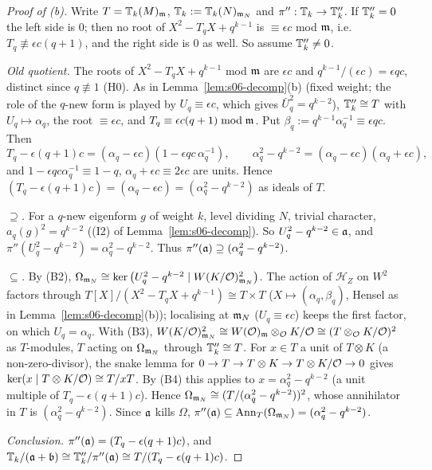 \begin{proof}[Proof of (b)]
Write $T=\mathbb{T}_k(M)_{\mathfrak{m}}$, $\mathbb{T}_k:=\mathbb{T}_k(N)_{\mathfrak{m}_N}$ and $\pi'':\mathbb{T}_k\to\mathbb{T}''_k$. If $\mathbb{T}''_k=0$ the left side is $0$; then no root of
$X^2-T_qX+q^{k-1}$ is $\equiv\epsilon c$ mod $\mathfrak{m}$, i.e.\ $T_q\not\equiv\epsilon c(q+1)$, and the right side is $0$ as well. So assume $\mathbb{T}''_k\ne0$.

\emph{Old quotient.} The roots of $X^2-T_qX+q^{k-1}$ mod $\mathfrak{m}$ are $\epsilon c$ and $q^{k-1}/(\epsilon c)=\epsilon qc$, distinct since
$q\not\equiv1$ (H0). As in Lemma~\ref{lem:s06-decomp}(b) (fixed weight; the role of the $q$-new form is played by $U_q\equiv\epsilon c$, which
gives $\bar U_q^2=q^{k-2}$), $\mathbb{T}''_k\cong T$ with $U_q\mapsto\alpha_q$, the root $\equiv\epsilon c$, and $T_q\equiv\epsilon c(q+1)\bmod\mathfrak{m}$. Put
$\beta_q:=q^{k-1}\alpha_q^{-1}\equiv\epsilon qc$. Then
\[T_q-\epsilon(q+1)c=(\alpha_q-\epsilon c)(1-\epsilon qc\,\alpha_q^{-1}),\qquad \alpha_q^2-q^{k-2}=(\alpha_q-\epsilon c)(\alpha_q+\epsilon c),\]
and $1-\epsilon qc\alpha_q^{-1}\equiv1-q$, $\alpha_q+\epsilon c\equiv2\epsilon c$ are units. Hence
$(T_q-\epsilon(q+1)c)=(\alpha_q-\epsilon c)=(\alpha_q^2-q^{k-2})$ as ideals of $T$.

\emph{$\supseteq$.} For a $q$-new eigenform $g$ of weight $k$, level dividing $N$, trivial character, $a_q(g)^2=q^{k-2}$ ((I2) of
Lemma~\ref{lem:s06-decomp}). So $U_q^2-q^{k-2}\in\mathfrak{a}$, and $\pi''(U_q^2-q^{k-2})=\alpha_q^2-q^{k-2}$. Thus $\pi''(\mathfrak{a})\supseteq(\alpha_q^2-q^{k-2})$.

\emph{$\subseteq$.} By (B2), $\Omega_{\mathfrak{m}_N}\cong\ker\big(U_q^2-q^{k-2}\mid W(K/\mathcal{O})^2_{\mathfrak{m}_N}\big)$. The action of $\mathcal H_Z$ on $W^2$ factors through
$T[X]/(X^2-T_qX+q^{k-1})\cong T\times T$ ($X\mapsto(\alpha_q,\beta_q)$, Hensel as in Lemma~\ref{lem:s06-decomp}(b)); localising at $\mathfrak{m}_N$
($U_q\equiv\epsilon c$) keeps the first factor, on which $U_q=\alpha_q$. With (B3),
$W(K/\mathcal{O})^2_{\mathfrak{m}_N}\cong W(\mathcal{O})_{\mathfrak{m}}\otimes_{\mathcal{O}} K/\mathcal{O}\cong(T\otimes_{\mathcal{O}} K/\mathcal{O})^2$ as $T$-modules, $T$ acting on $\Omega_{\mathfrak{m}_N}$ through
$\mathbb{T}''_k\cong T$. For $x\in T$ a unit of $T\otimes K$ (a non-zero-divisor), the snake lemma for $0\to T\to T\otimes K\to T\otimes K/\mathcal{O}\to0$
gives $\ker(x\mid T\otimes K/\mathcal{O})\cong T/xT$. By (B4) this applies to $x=\alpha_q^2-q^{k-2}$ (a unit multiple of $T_q-\epsilon(q+1)c$). Hence
$\Omega_{\mathfrak{m}_N}\cong(T/(\alpha_q^2-q^{k-2}))^{2}$, whose annihilator in $T$ is $(\alpha_q^2-q^{k-2})$. Since $\mathfrak{a}$ kills $\Omega$,
$\pi''(\mathfrak{a})\subseteq\operatorname{Ann}_T(\Omega_{\mathfrak{m}_N})=(\alpha_q^2-q^{k-2})$.

\emph{Conclusion.} $\pi''(\mathfrak{a})=(T_q-\epsilon(q+1)c)$, and $\mathbb{T}_k/(\mathfrak{a}+\mathfrak{b})\cong\mathbb{T}''_k/\pi''(\mathfrak{a})\cong T/(T_q-\epsilon(q+1)c)$.
\end{proof}

